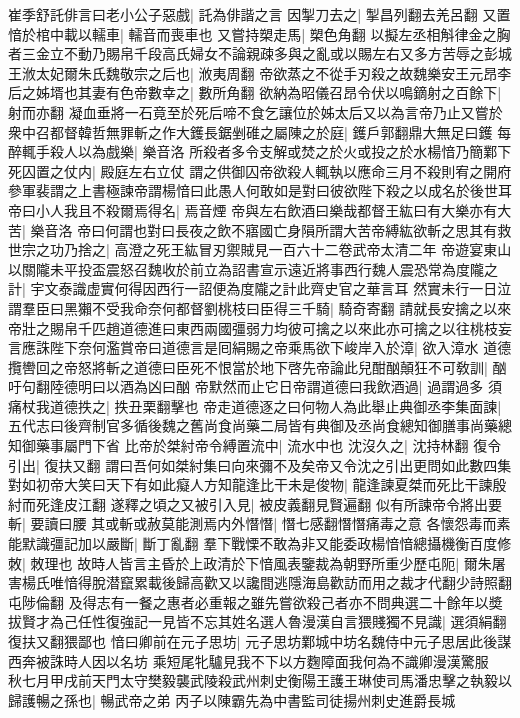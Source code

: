 崔季舒託俳言曰老小公子惡戲|{
	託為俳諧之言}
因掣刀去之|{
	掣昌列翻去羌呂翻}
又置愔於棺中載以轜車|{
	轜音而喪車也}
又嘗持槊走馬|{
	槊色角翻}
以擬左丞相斛律金之胸者三金立不動乃賜帛千段高氏婦女不論親疎多與之亂或以賜左右又多方苦辱之彭城王浟太妃爾朱氏魏敬宗之后也|{
	浟夷周翻}
帝欲蒸之不從手刃殺之故魏樂安王元昂李后之姊壻也其妻有色帝數幸之|{
	數所角翻}
欲納為昭儀召昂令伏以鳴鏑射之百餘下|{
	射而亦翻}
凝血垂將一石竟至於死后啼不食乞讓位於姊太后又以為言帝乃止又嘗於衆中召都督韓哲無罪斬之作大鑊長鋸剉碓之屬陳之於庭|{
	鑊戶郭翻鼎大無足曰鑊}
每醉輒手殺人以為戲樂|{
	樂音洛}
所殺者多令支解或焚之於火或投之於水楊愔乃簡鄴下死囚置之仗内|{
	殿庭左右立仗}
謂之供御囚帝欲殺人輒執以應命三月不殺則宥之開府參軍裴謂之上書極諫帝謂楊愔曰此愚人何敢如是對曰彼欲陛下殺之以成名於後世耳帝曰小人我且不殺爾焉得名|{
	焉音煙}
帝與左右飲酒曰樂哉都督王紘曰有大樂亦有大苦|{
	樂音洛}
帝曰何謂也對曰長夜之飲不寤國亡身隕所謂大苦帝縛紘欲斬之思其有救世宗之功乃捨之|{
	高澄之死王紘冒刃禦賊見一百六十二卷武帝太清二年}
帝遊宴東山以關隴未平投盃震怒召魏收於前立為詔書宣示遠近將事西行魏人震恐常為度隴之計|{
	宇文泰識虚實何得因西行一詔便為度隴之計此齊史官之華言耳}
然實未行一日泣謂羣臣曰黑獺不受我命奈何都督劉桃枝曰臣得三千騎|{
	騎奇寄翻}
請就長安擒之以來帝壯之賜帛千匹趙道德進曰東西兩國彊弱力均彼可擒之以來此亦可擒之以往桃枝妄言應誅陛下奈何濫賞帝曰道德言是囘絹賜之帝乘馬欲下峻岸入於漳|{
	欲入漳水}
道德攬轡回之帝怒將斬之道德曰臣死不恨當於地下啓先帝論此兒酣酗顛狂不可敎訓|{
	酗吁句翻陸德明曰以酒為凶曰酗}
帝默然而止它日帝謂道德曰我飲酒過|{
	過謂過多}
須痛杖我道德抶之|{
	抶丑栗翻擊也}
帝走道德逐之曰何物人為此舉止典御丞李集面諫|{
	五代志曰後齊制官多循後魏之舊尚食尚藥二局皆有典御及丞尚食總知御膳事尚藥總知御藥事屬門下省}
比帝於桀紂帝令縛置流中|{
	流水中也}
沈沒久之|{
	沈持林翻}
復令引出|{
	復扶又翻}
謂曰吾何如桀紂集曰向來彌不及矣帝又令沈之引出更問如此數四集對如初帝大笑曰天下有如此癡人方知龍逢比干未是俊物|{
	龍逢諫夏桀而死比干諫殷紂而死逢皮江翻}
遂釋之頃之又被引入見|{
	被皮義翻見賢遍翻}
似有所諫帝令將出要斬|{
	要讀曰腰}
其或斬或赦莫能測焉内外憯憯|{
	憯七感翻憯憯痛毒之意}
各懷怨毒而素能默識彊記加以嚴斷|{
	斷丁亂翻}
羣下戰慄不敢為非又能委政楊愔愔總攝機衡百度修敇|{
	敇理也}
故時人皆言主昏於上政清於下愔風表鑒裁為朝野所重少歷屯阨|{
	爾朱屠害楊氏唯愔得脫潜竄累載後歸高歡又以讒間逃隱海島歡訪而用之裁才代翻少詩照翻屯陟倫翻}
及得志有一餐之惠者必重報之雖先嘗欲殺己者亦不問典選二十餘年以奬拔賢才為己任性復強記一見皆不忘其姓名選人魯漫漢自言猥賤獨不見識|{
	選須絹翻復扶又翻猥鄙也}
愔曰卿前在元子思坊|{
	元子思坊鄴城中坊名魏侍中元子思居此後謀西奔被誅時人因以名坊}
乘短尾牝驢見我不下以方麴障面我何為不識卿漫漢驚服　秋七月甲戌前天門太守樊毅襲武陵殺武州刺史衡陽王護王琳使司馬潘忠擊之執毅以歸護暢之孫也|{
	暢武帝之弟}
丙子以陳霸先為中書監司徒揚州刺史進爵長城

